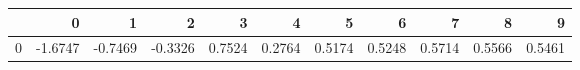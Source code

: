 \begin{tabular}{lrrrrrrrrrr}
\toprule
{} &       0 &       1 &       2 &       3 &       4 &       5 &       6 &       7 &       8 &       9 \\
\midrule
0 & -1.6747 & -0.7469 & -0.3326 &  0.7524 &  0.2764 &  0.5174 &  0.5248 &  0.5714 &  0.5566 &  0.5461 \\
\bottomrule
\end{tabular}
